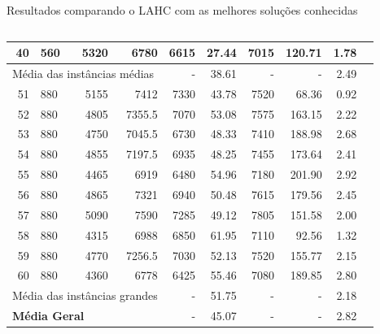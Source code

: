 \documentclass[8pt,mathserif,professionalfont]{beamer}
\begin{document}
\begin{frame}{Resultados comparando o LAHC com as melhores soluções conhecidas}
\begin{columns}
\begin{column}{0.5\textwidth}
\begin{table}[!]
{\begin{tabular}{rlrrrrrrrr}
40&	560	&	5320	&	6780	&	6615	&	27.44	&	7015	&	120.71	&	1.78	\\
 \midrule		
 \multicolumn{4}{l}{Média das instâncias médias}   -       &   -       &	38.61   &   -       &   -       &   2.49  \\		
  \midrule	
51	&	880	&	5155	&	7412	&	7330	&	43.78	&	7520	&	68.36	&	0.92	\\
52	&	880	&	4805	&	7355.5	&	7070	&	53.08	&	7575	&	163.15	&	2.22	\\
53	&	880	&	4750	&	7045.5	&	6730	&	48.33	&	7410	&	188.98	&	2.68	\\
54	&	880	&	4855	&	7197.5	&	6935	&	48.25	&	7455	&	173.64	&	2.41	\\
55	&	880	&	4465	&	6919	&	6480	&	54.96	&	7180	&	201.90	&	2.92	\\
56	&	880	&	4865	&	7321	&	6940	&	50.48	&	7615	&	179.56	&	2.45	\\
57	&	880	&	5090	&	7590	&	7285	&	49.12	&	7805	&	151.58	&	2.00	\\
58	&	880	&	4315	&	6988	&	6850	&	61.95	&	7110	&	92.56	&	1.32	\\
59	&	880	&	4770	&	7256.5	&	7030	&	52.13	&	7520	&	155.77	&	2.15	\\
60	&	880	&	4360	&	6778	&	6425	&	55.46	&	7080	&	189.85	&	2.80	\\
\midrule		
\multicolumn{4}{l}{Média das instâncias grandes}  &   -  &	51.75   &   -       &   -       &   2.18  \\		
	 \midrule								
 \multicolumn{4}{l}{ \textbf{Média Geral} }          &  -        & 45.07     &   -       &  -        &    2.82 \\ 
   \bottomrule
\end{tabular}
}
\end{table}
    
\end{column}
\end{columns}
\end{frame}

\end{document}
